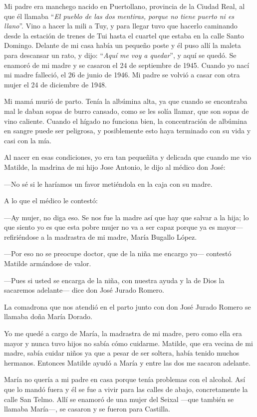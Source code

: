 \documentclass[12pt,a5paper]{book}
\begin{document}
Mi padre era manchego nacido en Puertollano, provincia de la Ciudad Real, al que él llamaba ``\textit{El pueblo de las dos mentiras, porque no tiene puerto ni es llano}''. Vino a hacer la mili a Tuy, y para llegar tuvo que hacerlo caminando desde la estación de trenes de Tui hasta el cuartel que estaba en la calle Santo Domingo. Delante de mi casa había un pequeño poste y él puso allí la maleta para descansar un rato, y dijo: ``\textit{Aquí me voy a  quedar}'', y aquí se quedó. Se enamoró de mi madre y se casaron el 24 de septiembre de 1945. Cuando yo nací mi madre falleció, el 26 de junio de 1946. Mi padre se volvió a casar con otra mujer el 24 de diciembre de 1948.

Mi mamá murió de parto. Tenía la albúmina alta, ya que cuando se encontraba mal le daban sopas de burro cansado, como se les solía llamar, que son sopas de vino caliente. Cuando el hígado no funciona bien, la concentración de albúmina en sangre puede ser peligrosa, y posiblemente esto haya terminado con su vida y casi con la mía.

Al nacer en esas condiciones, yo era tan pequeñita y delicada que cuando me vio Matilde, la madrina de mi hijo Jose Antonio, le dijo al médico don José:

---No sé si le haríamos un favor metiéndola en la caja con su madre.

A lo que el médico le contestó:

---Ay mujer, no diga eso. Se nos fue la madre así que hay que salvar a la hija; lo que siento yo es que esta pobre mujer no va a ser capaz porque ya es mayor--- refiriéndose a la madrastra de mi madre, María Bugallo López.

---Por eso no se preocupe doctor, que de la niña me encargo yo--- contestó Matilde armándose de valor.

---Pues si usted se encarga de la niña, con nuestra ayuda y la de Dios la sacaremos adelante--- dice don José Jurado Romero.

La comadrona que nos atendió en el parto junto con don José Jurado Romero se llamaba doña María Dorado.

Yo me quedé a cargo de María, la madrastra de mi madre, pero como ella era mayor y nunca tuvo hijos no sabía cómo cuidarme. Matilde, que era vecina de mi madre, sabía cuidar niños ya que a pesar de ser soltera, había tenido muchos hermanos. Entonces Matilde ayudó a María y entre las dos me sacaron adelante.

María no quería a mi padre en casa porque tenía problemas con el alcohol. Así que lo mandó fuera y él se fue a vivir para las calles de abajo, concretamente la calle San Telmo. Allí se enamoró de una mujer del Seixal ---que también se llamaba María---, se casaron y se fueron para Castilla.
\end{document}
